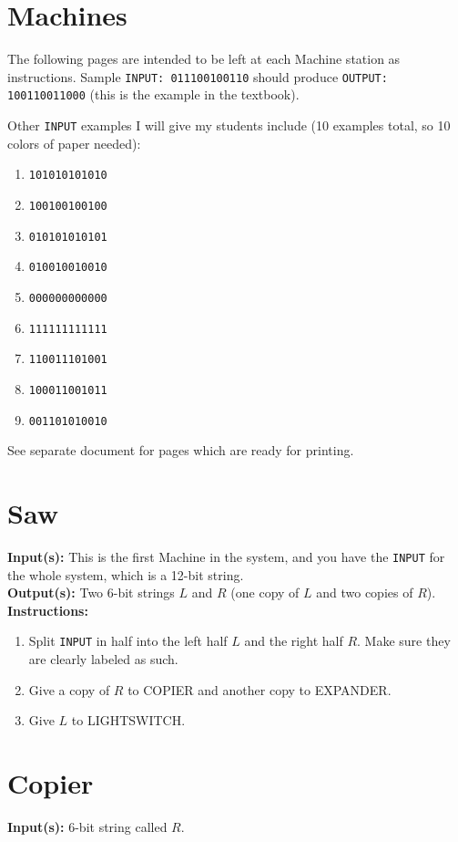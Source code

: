 \documentclass[12pt]{amsart}
\theoremstyle{plain}
\theoremstyle{definition}
\theoremstyle{remark}
\begin{document}
\newpage \section{Machines}
The following pages are intended to be left at each Machine station as instructions.  Sample \texttt{INPUT: 011100100110} should produce \texttt{OUTPUT: 100110011000} (this is the example in the textbook).

Other \texttt{INPUT} examples I will give my students include (10 examples total, so 10 colors of paper needed):
\begin{enumerate}[1.]
	\item \texttt{101010101010}
	\item \texttt{100100100100}
	\item \texttt{010101010101}
	\item \texttt{010010010010}
	\item \texttt{000000000000}
	\item \texttt{111111111111}
	\item \texttt{110011101001}
	\item \texttt{100011001011}
	\item \texttt{001101010010}
\end{enumerate}

See separate document for pages which are ready for printing.

\newpage
\section*{Saw}
\textbf{Input(s):}  This is the first Machine in the system, and you have the \texttt{INPUT} for the whole system, which is a 12-bit string.\\

\textbf{Output(s):} Two 6-bit strings $L$ and $R$ (one copy of $L$ and two copies of $R$).\\

\textbf{Instructions:}
\begin{enumerate}[1.]
	\item Split \texttt{INPUT} in half into the left half $L$ and the right half $R$.  Make sure they are clearly labeled as such.
	\item Give a copy of $R$ to COPIER and another copy to EXPANDER.
	\item Give $L$ to LIGHTSWITCH.
\end{enumerate}

\newpage
\section*{Copier}
\textbf{Input(s):}  6-bit string called $R$.\\
\end{document}
